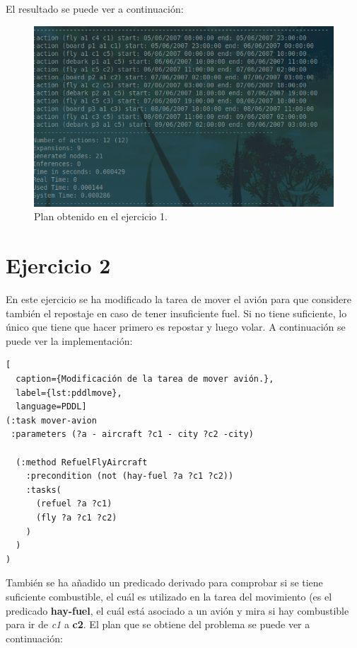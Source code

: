 \documentclass[11pt,a4paper]{article}
\begin{document}
El resultado se puede ver a continuación:

\begin{figure}[H]
\centering
\includegraphics[scale=0.4]{img/e1.png}
\caption{Plan obtenido en el ejercicio 1.}
\end{figure}

\section{Ejercicio 2}

En este ejercicio se ha modificado la tarea de mover el avión para que considere también el repostaje en caso de tener insuficiente
fuel. Si no tiene suficiente, lo único que tiene que hacer primero es repostar y luego volar. A continuación se puede ver
la implementación:

\begin{algorithm}[H]
\begin{lstlisting}[
  caption={Modificación de la tarea de mover avión.},
  label={lst:pddlmove},
  language=PDDL]
(:task mover-avion
 :parameters (?a - aircraft ?c1 - city ?c2 -city)
  
  (:method RefuelFlyAircraft
    :precondition (not (hay-fuel ?a ?c1 ?c2))
    :tasks(
      (refuel ?a ?c1)
      (fly ?a ?c1 ?c2)
    )
  )
)
\end{lstlisting}
\end{algorithm}

También se ha añadido un predicado derivado para comprobar si se tiene suficiente combustible, el cuál es utilizado en la tarea del
movimiento (es el predicado \textbf{hay-fuel}, el cuál está asociado a un avión y mira si hay combustible para ir de \textit{c1} a
\textbf{c2}. El plan que se obtiene del problema se puede ver a continuación:
\end{document}
